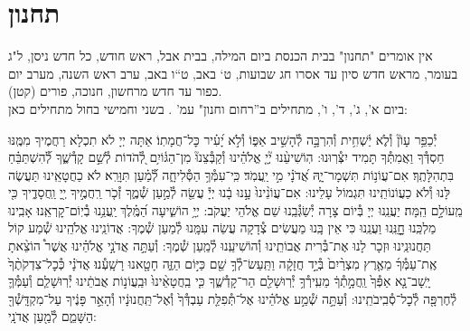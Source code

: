 \documentclass[twoside, openany, parskip=half, 11pt]{book}
\begin{document}
\nextpage


\section[תחנון]{ תחנון }
\label{tachanun mon thurs}
\begin{scriptsize}

\textsf{
אין אומרים "תחנון" בבית הכנסת ביום המילה, בבית אבל, ראש חודש, כל חדש ניסן, ל"ג בעומר, מראש חדש סיון עד אסרו חג שבועות, ט` באב, ט``ו באב, ערב ראש השנה, מערב יום כפור עד חדש מרחשון, חנוכה, פורים (קטן).\\
ביום א', ג', ד', ו', מתחילים ב''רחום וחנון" עמ'
\pageref{nefilas_apayim}.
בשני וחמישי בחול מתחילים כאן:
}

\end{scriptsize}

יְ֯כַפֵּ֥ר עָוֹן֘ וְ֯לֹ֢א יַ֫שְׁחִ֥ית וְ֯הִרְבָּ֣ה לְ֯הָשִׁ֣יב אַפּ֑וֹ וְ֯לֹ֣א יָ֝עִ֗יר כׇּל־חֲמָתֽוֹ׃ אַתָּה יְיָ לֹא תִכְלָא רַחֲמֶיךָ מִמֶּֽנּוּ חַסְדְּ֯ךָ וַאֲמִתְּ֯ךָ תָּמִיד יִצְּ֯רֽוּנוּ: הֽוֹשִׁיעֵ֨נוּ יְ֘יָ֤ אֱלֹהֵ֗ינוּ וְ֯קַבְּ֯צֵנוּ֘ מִן־הַגּ֫וֹיִ֥ם לְ֭֯הֹדוֹת לְ֯שֵׁ֣ם קָדְ֯שֶׁ֑ךָ לְ֝֯הִשְׁתַּבֵּ֗חַ בִּתְהִלָּתֶֽךָ׃
אִם־עֲוֹנ֥וֹת תִּשְׁמָר־יָ֑הּ אֲ֝דֹנָ֗י מִ֣י יַֽעֲמֹֽד׃ כִּֽי־עִמְּ֯ךָ֥ הַסְּ֯לִיחָ֑ה לְ֝֯מַ֗עַן תִּוָּרֵֽא׃ לֹא כַחֲטָאֵֽינוּ תַּעֲשֶׂה לָּנוּ וְ֯לֹא כַעֲוֹנוֹתֵֽינוּ תִּגְמוֹל עָלֵינוּ:
אִם־עֲוֹנֵ֨ינוּ֙ עָ֣נוּ בָ֔נוּ יְיָ֕ עֲשֵׂ֖ה לְ֯מַ֣עַן שְׁ֯מֶ֑ךָ זְ֯כֹ֤ר רַֽחֲמֶ֣יךָ יְ֖יָ וַֽחֲסָדֶ֑יךָ כִּ֖י מֵֽעוֹלָ֣ם הֵֽמָּה׃ יַעֲנֵֽנוּ יְיָ בְּ֯יוֹם צָרָה יְ֯שַׂגְּ֯בֵֽנוּ שֵׁם אֱלֹהֵי יַעֲקֹב:
יְיָ֥ הוֹשִׁ֑יעָה הַ֝מֶּֽ֗לֶךְ יַֽעֲנֵ֥נוּ בְ֯יֽוֹם־קׇרְאֵֽנוּ׃
אָבִֽינוּ מַלְכֵּֽנוּ חׇׇׇׇנֵּֽנוּ וַעֲנֵֽנוּ כִּי אֵין בָּֽנוּ מַעֲשִׂים צְ֯דָקָה עֲשֵׂה עִמָּֽנוּ לְ֯מַעַן שְׁ֯מֶךָ:
אֲדוֹנֵֽינוּ אֱלֹהֵֽינוּ שְׁ֯מַע קוֹל תַּחֲנוּנֵֽינוּ וּזְכָר לָנוּ אֶת־בְּ֯רִית אֲבוֹתֵֽינוּ וְ֯הוֹשִׁיעֵֽנוּ לְ֯מַֽעַן שְׁ֯מֶךָ:
וְ֯עַתָּ֣ה אֲדֹנָ֣י אֱלֹהֵ֗ינוּ אֲשֶׁר֩ הוֹצֵ֨אתָ אֶֽת־עַמְּ֯ךָ֜ מֵאֶ֤רֶץ מִצְרַ֨יִם֙ בְּ֯יָ֣ד חֲזָקָ֔ה וַתַּֽעַשׂ־לְ֯ךָ֥ שֵׁ֖ם כַּיּ֣וֹם הַזֶּ֑ה חָטָ֖אנוּ רָשָֽׁעְ֯נוּ׃
אֲדֹנָ֗י כְּ֯כׇל־צִדְקֹתֶ֨ךָ֙ יָֽשָׁב־נָ֤א אַפְּ֯ךָ֙ וַֽחֲמָ֣תְ֯ךָ֔ מֵעִֽירְ֯ךָ֥ יְ֯רֽוּשָׁלַ֖ם הַר־קָדְ֯שֶׁ֑ךָ כִּ֤י בַֽחֲטָאֵ֨ינוּ֙ וּבַֽעֲוֹנ֣וֹת אֲבֹתֵ֔ינוּ יְ֯רֽוּשָׁלַ֧ם וְ֯עַמְּ֯ךָ֛ לְ֯חֶרְפָּ֖ה לְ֯כׇל־סְ֯בִֽיבֹתֵֽינוּ:
וְ֯עַתָּ֣ה שְׁ֯מַ֣ע אֱלֹהֵ֗ינוּ אֶל־תְּ֯פִלַּ֤ת עַבְדְּ֯ךָ֙ וְ֯אֶל־תַּֽחֲנוּנָ֔יו וְ֯הָאֵ֣ר פָּנֶ֔יךָ עַל־מִקְדָּֽשְׁ֯ךָ֖ הַשָּׁמֵ֑ם לְ֯מַ֖עַן אֲדֹנָֽי:
\end{document}
